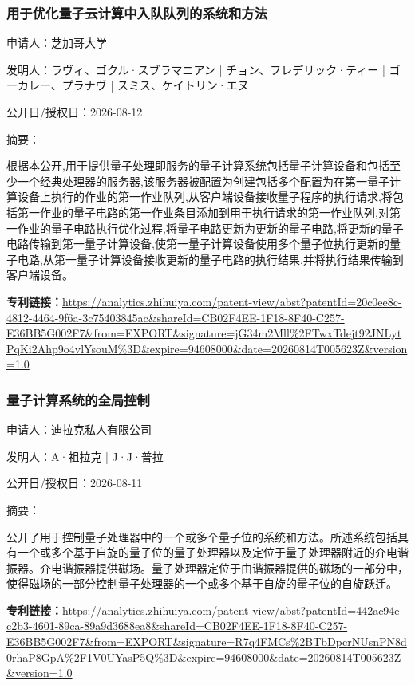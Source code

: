 \documentclass[12pt,a4paper]{ctexart}
\begin{document}
\subsubsection{ 用于优化量子云计算中入队队列的系统和方法 }

申请人：芝加哥大学

发明人：ラヴィ、ゴクル·スブラマニアン | チョン、フレデリック·ティー | ゴーカレー、プラナヴ | スミス、ケイトリン·エヌ

公开日/授权日：2026-08-12

摘要：

根据本公开,用于提供量子处理即服务的量子计算系统包括量子计算设备和包括至少一个经典处理器的服务器,该服务器被配置为创建包括多个配置为在第一量子计算设备上执行的作业的第一作业队列,从客户端设备接收量子程序的执行请求,将包括第一作业的量子电路的第一作业条目添加到用于执行请求的第一作业队列,对第一作业的量子电路执行优化过程,将量子电路更新为更新的量子电路,将更新的量子电路传输到第一量子计算设备,使第一量子计算设备使用多个量子位执行更新的量子电路,从第一量子计算设备接收更新的量子电路的执行结果,并将执行结果传输到客户端设备。

\noindent\textbf{专利链接：}\url{https://analytics.zhihuiya.com/patent-view/abst?patentId=20c0ee8c-4812-4464-9f6a-3c75403845ac&shareId=CB02F4EE-1F18-8F40-C257-E36BB5G002F7&from=EXPORT&signature=jG34m2Mll%2FTwxTdejt92JNLytPqKi2Ahp9o4vlYsouM%3D&expire=94608000&date=20260814T005623Z&version=1.0}

\subsubsection{ 量子计算系统的全局控制 }

申请人：迪拉克私人有限公司

发明人：A·祖拉克 | J·J·普拉

公开日/授权日：2026-08-11

摘要：

公开了用于控制量子处理器中的一个或多个量子位的系统和方法。所述系统包括具有一个或多个基于自旋的量子位的量子处理器以及定位于量子处理器附近的介电谐振器。介电谐振器提供磁场。量子处理器定位于由谐振器提供的磁场的一部分中，使得磁场的一部分控制量子处理器的一个或多个基于自旋的量子位的自旋跃迁。

\noindent\textbf{专利链接：}\url{https://analytics.zhihuiya.com/patent-view/abst?patentId=442ac94e-c2b3-4601-89ca-89a9d3688ea8&shareId=CB02F4EE-1F18-8F40-C257-E36BB5G002F7&from=EXPORT&signature=R7q4FMCs%2BTbDpcrNUsnPN8d0rhaP8GpA%2F1V0UYasP5Q%3D&expire=94608000&date=20260814T005623Z&version=1.0}
\end{document}
